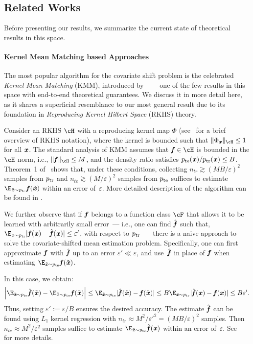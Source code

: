 \subsection{Related Works}
Before presenting our results, we summarize the current state of theoretical results in this space.

\paragraph{Kernel Mean Matching based Approaches}
The most popular algorithm for the covariate shift problem is the celebrated \emph{Kernel Mean Matching} (KMM), introduced by \cite{huang2006correcting}~---~one of the few results in this space with end-to-end theoretical guarantees. We discuss it in more detail here, as it shares a superficial resemblance to our most general result due to its foundation in \emph{Reproducing Kernel Hilbert Space} (RKHS) theory. 
 

Consider an RKHS $\cH$ with a reproducing kernel map $\Phi$ (see~ for a brief overview of RKHS notation),  where the kernel is bounded such that $\|\Phi_{\xx}\|_{\cH} \leq 1$ for all $\boldsymbol{\mathit{x}}$. The standard analysis of KMM assumes that $\ff \in \cH$ is bounded in the $\cH$ norm, i.e., $\|\ff\|_{\cH} \leq M$, and the density ratio satisfies $p_{\mathrm{te}}(\boldsymbol{\mathit{x}})/p_{\mathrm{tr}}(\boldsymbol{\mathit{x}}) \leq B$. Theorem~1 of~\textcite{yu2012analysis} shows that, under these conditions, collecting $n_{tr} \gtrsim (MB/\varepsilon)^2$ samples from $p_{\mathrm{tr}}$ and $n_{te} \gtrsim (M/\varepsilon)^2$ samples from $p_{\mathrm{te}}$ suffices to estimate $\E_{\tilde{\xx} \sim \pte} \ff(\tilde{\xx})$ within an error of~$\varepsilon$. More detailed description of the algorithm can be found in .

We further observe that if $\boldsymbol{\mathit{f}}$ belongs to a function class $\cF$ that allows it to be learned with arbitrarily small error~--- i.e., one can find $\hat{\boldsymbol{\mathit{f}}}$ such that, $\E_{\xx \sim \ptr} |\ff(\xx) - \hat{\ff}(\xx)| \leq \varepsilon'$, with respect to $p_{\mathrm{tr}}$~--- there is a naive approach to solve the covariate-shifted mean estimation problem. Specifically, one can first approximate $\boldsymbol{\mathit{f}}$ with $\hat{\boldsymbol{\mathit{f}}}$ up to an error $\varepsilon' \ll \varepsilon$, and use~$\hat{\boldsymbol{\mathit{f}}}$ in place of $\boldsymbol{\mathit{f}}$ when estimating $\E_{\tilde{\xx}\sim\pte} \ff(\tilde{\xx})$. 

In this case, we obtain:
\begin{equation*}
\left|\E_{\tilde{\xx} \sim \pte} \hat{\ff}(\tilde{\xx}) - \E_{\tilde{\xx}\sim\pte} \ff(\tilde{\xx})\right| \leq \E_{\tilde{\xx} \sim \pte} |\hat{\ff}(\tilde{\xx}) - \ff(\tilde{\xx})| \leq B \E_{\xx \sim \ptr} |\hat{\ff}(\xx) - \ff(\xx)| \leq B \varepsilon'.
\end{equation*}
Thus, setting $\varepsilon':= \varepsilon/B$ ensures the desired accuracy. The estimate $\hat{\boldsymbol{\mathit{f}}}$ can be found using $L_1$ kernel regression with $n_{tr} \approx M^2/{\varepsilon'}^2 = (MB/\varepsilon)^2$ samples. Then $n_{te} \approx M^2/\varepsilon^2$ samples suffice to estimate $\E_{\tilde{\xx} \sim 
\pte} \hat{\ff}(\xx)$ within an error of~$\varepsilon$. See~ for more details.

